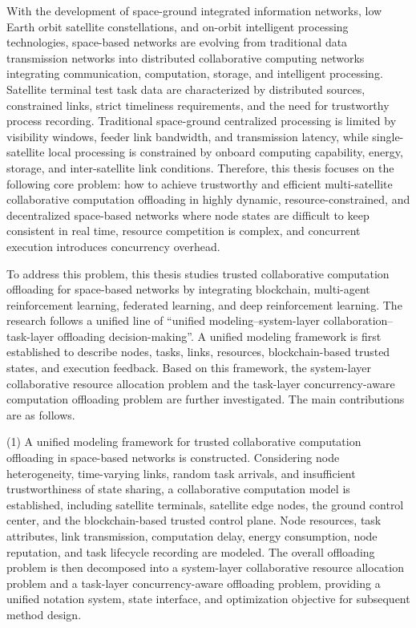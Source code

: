 \begin{abstractEn}
  With the development of space-ground integrated information networks, low Earth orbit satellite constellations, and on-orbit intelligent processing technologies, space-based networks are evolving from traditional data transmission networks into distributed collaborative computing networks integrating communication, computation, storage, and intelligent processing. Satellite terminal test task data are characterized by distributed sources, constrained links, strict timeliness requirements, and the need for trustworthy process recording. Traditional space-ground centralized processing is limited by visibility windows, feeder link bandwidth, and transmission latency, while single-satellite local processing is constrained by onboard computing capability, energy, storage, and inter-satellite link conditions. Therefore, this thesis focuses on the following core problem: how to achieve trustworthy and efficient multi-satellite collaborative computation offloading in highly dynamic, resource-constrained, and decentralized space-based networks where node states are difficult to keep consistent in real time, resource competition is complex, and concurrent execution introduces concurrency overhead.

  To address this problem, this thesis studies trusted collaborative computation offloading for space-based networks by integrating blockchain, multi-agent reinforcement learning, federated learning, and deep reinforcement learning. The research follows a unified line of “unified modeling--system-layer collaboration--task-layer offloading decision-making”. A unified modeling framework is first established to describe nodes, tasks, links, resources, blockchain-based trusted states, and execution feedback. Based on this framework, the system-layer collaborative resource allocation problem and the task-layer concurrency-aware computation offloading problem are further investigated. The main contributions are as follows.

  (1) A unified modeling framework for trusted collaborative computation offloading in space-based networks is constructed. Considering node heterogeneity, time-varying links, random task arrivals, and insufficient trustworthiness of state sharing, a collaborative computation model is established, including satellite terminals, satellite edge nodes, the ground control center, and the blockchain-based trusted control plane. Node resources, task attributes, link transmission, computation delay, energy consumption, node reputation, and task lifecycle recording are modeled. The overall offloading problem is then decomposed into a system-layer collaborative resource allocation problem and a task-layer concurrency-aware offloading problem, providing a unified notation system, state interface, and optimization objective for subsequent method design.


\end{abstractEn}
